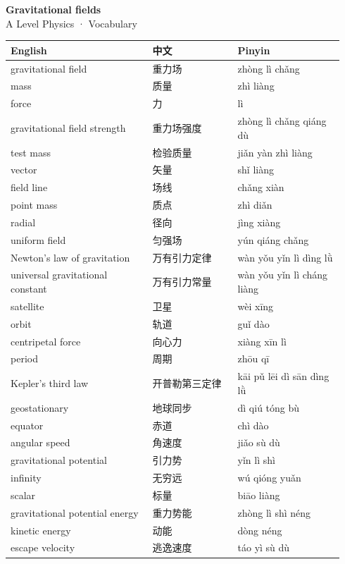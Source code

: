 \documentclass[11pt]{article}
\begin{document}
\begin{center}
  {\LARGE\bfseries Gravitational fields}\\[0.35em]
  {\large A Level Physics · Vocabulary}
\end{center}
\vspace{0.6em}

\begin{longtable}{@{}p{0.40\linewidth}p{0.24\linewidth}p{0.30\linewidth}@{}}
\toprule
\textbf{English} & \textbf{中文} & \textbf{Pinyin} \\
\midrule
\endhead
\bottomrule
\endlastfoot
gravitational field & 重力场 & zhòng lì chǎng \\
mass & 质量 & zhì liàng \\
force & 力 & lì \\
gravitational field strength & 重力场强度 & zhòng lì chǎng qiáng dù \\
test mass & 检验质量 & jiǎn yàn zhì liàng \\
vector & 矢量 & shǐ liàng \\
field line & 场线 & chǎng xiàn \\
point mass & 质点 & zhì diǎn \\
radial & 径向 & jìng xiàng \\
uniform field & 匀强场 & yún qiáng chǎng \\
Newton's law of gravitation & 万有引力定律 & wàn yǒu yǐn lì dìng lǜ \\
universal gravitational constant & 万有引力常量 & wàn yǒu yǐn lì cháng liàng \\
satellite & 卫星 & wèi xīng \\
orbit & 轨道 & guǐ dào \\
centripetal force & 向心力 & xiàng xīn lì \\
period & 周期 & zhōu qī \\
Kepler's third law & 开普勒第三定律 & kāi pǔ lēi dì sān dìng lǜ \\
geostationary & 地球同步 & dì qiú tóng bù \\
equator & 赤道 & chì dào \\
angular speed & 角速度 & jiǎo sù dù \\
gravitational potential & 引力势 & yǐn lì shì \\
infinity & 无穷远 & wú qióng yuǎn \\
scalar & 标量 & biāo liàng \\
gravitational potential energy & 重力势能 & zhòng lì shì néng \\
kinetic energy & 动能 & dòng néng \\
escape velocity & 逃逸速度 & táo yì sù dù \\
\end{longtable}
\end{document}
